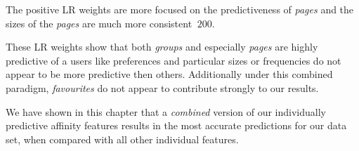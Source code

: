 The positive LR weights are more focused on the predictiveness of \emph{pages} and the sizes of the \emph{pages} are much more consistent 
$~200$.

These LR weights show that both \emph{groups} and especially \emph{pages} are highly predictive of a users like preferences and particular 
sizes or frequencies do not appear to be more predictive then others. Additionally under this combined paradigm, \emph{favourites} do not appear 
to contribute strongly to our results.

We have shown in this chapter that a \emph{combined} version of our individually predictive affinity features results in the most 
accurate predictions for our data set, when compared with all other individual features.

